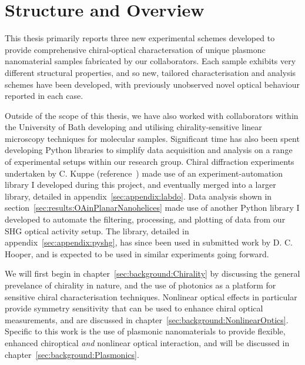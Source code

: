 \chapter{Structure and Overview}\label{sec:background:Introduction}

This thesis primarily reports three new experimental schemes developed to provide comprehensive chiral-optical charactersation of unique plasmonc nanomaterial samples fabricated by our collaborators. Each sample exhibits very different structural properties, and so new, tailored characterisation and analysis schemes have been developed, with previously unobserved novel optical behaviour reported in each case.

Outside of the scope of this thesis, we have also worked with collaborators within the University of Bath developing and utilising chirality-sensitive linear microscopy techniques for molecular samples. Significant time has also been spent developing Python libraries to simplify data acquisition and analysis on a range of experimental setups within our research group. Chiral diffraction experiments undertaken by C. Kuppe (reference~\cite{Kuppe2018}) made use of an experiment-automation library I developed during this project, and eventually merged into a larger library, detailed in appendix~\ref{sec:appendix:labdo}. Data analysis shown in section~\ref{sec:results:OAinPlanarNanohelices} made use of another Python library I developed to automate the filtering, processing, and plotting of data from our SHG optical activity setup. The library, detailed in appendix~\ref{sec:appendix:pyshg}, has since been used in submitted work by D. C. Hooper, and is expected to be used in similar experiments going forward.

We will first begin in chapter~\ref{sec:background:Chirality} by discussing the general prevelance of chirality in nature, and the use of photonics as a platform for sensitive chiral characterisation techniques. Nonlinear optical effects in particular provide symmetry sensitivity that can be used to enhance chiral optical measurements, and are discussed in chapter~\ref{sec:background:NonlinearOptics}. Specific to this work is the use of plasmonic nanomaterials to provide flexible, enhanced chiroptical \textit{and} nonlinear optical interaction, and will be discussed in chapter~\ref{sec:background:Plasmonics}. 
